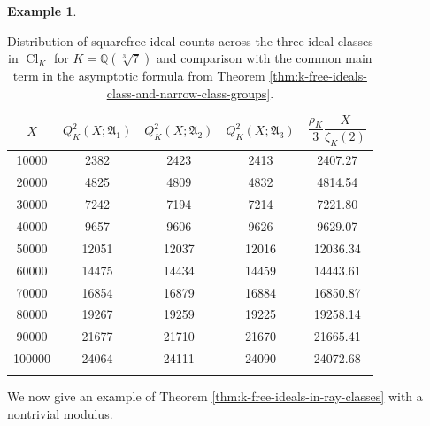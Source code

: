\documentclass[11pt, reqno]{amsart}
\numberwithin{equation}{section}
\newcommand{\Q}{\mathbb{Q}}
\newcommand{\Cl}{\operatorname{Cl}}
\theoremstyle{definition}
\newtheorem{example}[theorem]{Example}
\begin{document}
\begin{example}
\begin{table}[H]
\centering
\renewcommand{\arraystretch}{1.3}
\begin{tabular}{c c c c c}
\toprule
$X$
&
$Q_K^{2}(X;\mathfrak{A}_1)$
&
$Q_K^{2}(X;\mathfrak{A}_2)$
&
$Q_K^{2}(X;\mathfrak{A}_3)$
&
$\dfrac{\rho_K}{3}\dfrac{X}{\zeta_K(2)}$
\\
\midrule
10000  & 2382  & 2423  & 2413  & 2407.27 \\
20000  & 4825  & 4809  & 4832  & 4814.54 \\
30000  & 7242  & 7194  & 7214  & 7221.80 \\
40000  & 9657  & 9606  & 9626  & 9629.07 \\
50000  & 12051 & 12037 & 12016 & 12036.34 \\
60000  & 14475 & 14434 & 14459 & 14443.61 \\
70000  & 16854 & 16879 & 16884 & 16850.87 \\
80000  & 19267 & 19259 & 19225 & 19258.14 \\
90000  & 21677 & 21710 & 21670 & 21665.41 \\
100000 & 24064 & 24111 & 24090 & 24072.68 \\
\bottomrule\\
\end{tabular}
\caption{Distribution of squarefree ideal counts across the three ideal classes in $\Cl_K$ for $K=\Q(\sqrt[3]{7})$ and comparison with the common main term in the asymptotic formula from Theorem \ref{thm:k-free-ideals-class-and-narrow-class-groups}.}
\label{table:cubic-field-class-group-squarefree}
\end{table}




\end{example}


We now give an example of Theorem \ref{thm:k-free-ideals-in-ray-classes} with a nontrivial modulus.
\end{document}
